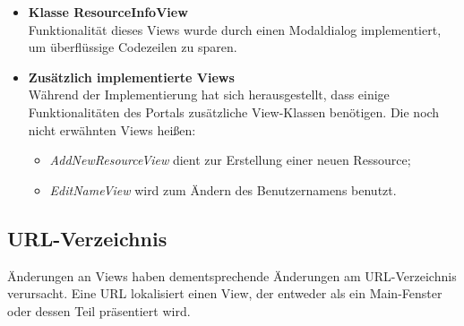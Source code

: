 \documentclass[parskip=full,11pt]{scrartcl}
\begin{document}
\begin{itemize}
\item \textbf{Klasse ResourceInfoView}\\
Funktionalität dieses Views wurde durch einen Modaldialog implementiert, um überflüssige Codezeilen zu sparen.
\newpage
\item \textbf{Zusätzlich implementierte Views}\\
Während der Implementierung hat sich herausgestellt, dass einige Funktionalitäten des Portals zusätzliche View-Klassen benötigen. Die noch nicht erwähnten Views heißen:
\begin{itemize}
\item \textit{AddNewResourceView} dient zur Erstellung einer neuen Ressource;
\item \textit{EditNameView} wird zum Ändern des Benutzernamens benutzt.
\end{itemize} 
\end{itemize}

\subsection{URL-Verzeichnis}
Änderungen an Views haben dementsprechende Änderungen am URL-Verzeichnis verursacht. Eine URL lokalisiert einen View, der entweder als ein Main-Fenster oder dessen Teil präsentiert wird.  \\
\renewcommand{\labelitemi}{$\bullet$}
\renewcommand{\labelitemii}{}
\renewcommand{\labelitemiii}{}
\renewcommand{\labelitemiv}{}  
\end{document}
